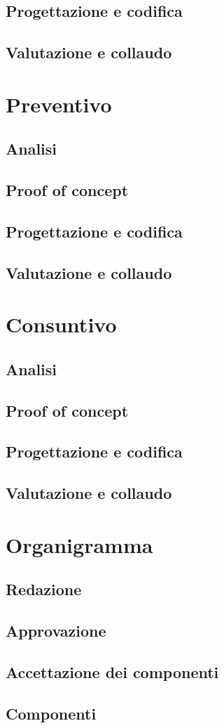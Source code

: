 \documentclass[a4paper, 11pt]{article}
\begin{document}
\subsection{Progettazione e codifica}
\subsection{Valutazione e collaudo}

\section{Preventivo}
\subsection{Analisi}
\subsection{Proof of concept}
\subsection{Progettazione e codifica}
\subsection{Valutazione e collaudo}

\section{Consuntivo}
\subsection{Analisi}
\subsection{Proof of concept}
\subsection{Progettazione e codifica}
\subsection{Valutazione e collaudo}

\section{Organigramma}
\subsection{Redazione}
\subsection{Approvazione}
\subsection{Accettazione dei componenti}
\subsection{Componenti}









\end{document}
